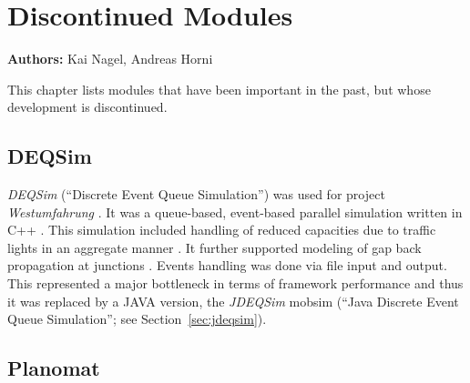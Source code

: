 \chapter{Discontinued Modules}
\label{ch:discontinued}

\hfill \textbf{Authors:} Kai Nagel, Andreas Horni

This chapter lists modules that have been important in the past, but whose development is discontinued.

\section{DEQSim}
\label{sec:deqsim}
\emph{DEQSim} (``Discrete Event Queue Simulation'') was used for project \emph{Westumfahrung} \citep[][]{BalmerEtAl_ResRep_bdktzrh_2009}. It was a queue-based, event-based parallel simulation written in C++ \citep[][]{CharyparEtAl_TRR_2007, Charypar_PhDThesis_2008}. This simulation included handling of reduced capacities due to traffic lights in an aggregate manner \citep[][p.139 ff]{Charypar_PhDThesis_2008}. It further supported modeling of gap back propagation at junctions \citep[][p.98 ff]{Charypar_PhDThesis_2008}. Events handling was done via file input and output. This represented a major bottleneck in terms of framework performance and thus it was replaced by a JAVA version, the \emph{JDEQSim} mobsim (``Java Discrete Event Queue Simulation''; see Section~\ref{sec:jdeqsim}).

\section{Planomat}
\label{sec:planomat}


